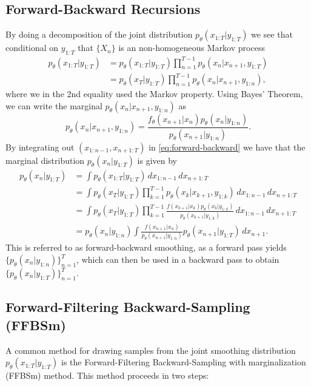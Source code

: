 \subsection{Forward-Backward Recursions}
By doing a decomposition of the joint distribution $p_\theta(x_{1:T} \vert y_{1:T})$ we see that conditional on $y_{1:T}$ that $\{X_n\}$ is an non-homogeneous Markov process
\begin{align}
	p_\theta(x_{1:T} \vert y_{1:T})&=p_\theta(x_{1:T} \vert  y_{1:T})\prod_{n=1}^{T-1}p_\theta(x_n \vert x_{n+1}, y_{1:T}) \nonumber \\
	&=p_\theta(x_T \vert y_{1:T})\prod_{n=1}^{T-1}p_\theta(x_n \vert x_{n+1}, y_{1:n}), \label{eq:forward-backward}  
\end{align}
where we in the 2nd equality used the Markov property. Using Bayes' Theorem, we can write the marginal $p_\theta(x_n \vert x_{n+1}, y_{1:n})$ as
\begin{equation}
	p_\theta(x_n \vert x_{n+1}, y_{1:n}) = \frac{f_\theta(x_{n+1} \vert x_n) p_\theta(x_n \vert y_{1:n})}{p_\theta(x_{n+1} \vert y_{1:n})}.
	\label{eq:marginal_FBR}
\end{equation}
By integrating out $(x_{1:n-1}, x_{n+1:T})$ in  \cref{eq:forward-backward} we have that the marginal distribution $p_\theta(x_n \vert y_{1:T})$ is given by
\begin{align}
	p_\theta(x_n \vert y_{1:T})&=\int p_\theta(x_{1:T} \vert y_{1:T})\, dx_{1:n-1} \, dx_{n+1:T} \nonumber \\
	&=\int p_\theta(x_T \vert y_{1:T})\prod_{k=1}^{T-1}p_\theta(x_k \vert x_{k+1}, y_{1:k}) \, dx_{1:n-1} \, dx_{n+1:T} \nonumber \\
	&=\int p_\theta(x_T \vert y_{1:T})\prod_{k=1}^{T-1}\frac{f(x_{k+1} \vert x_k) p_\theta(x_k \vert y_{1:k})}{p_\theta(x_{k+1} \vert y_{1:k})} \, dx_{1:n-1} \, dx_{n+1:T} \nonumber \\
	&=p_\theta(x_n \vert y_{1:n}) \int \frac{f(x_{n+1} \vert x_n)}{p_\theta(x_{n+1} \vert y_{1:n})}p_\theta(x_{n+1} \vert y_{1:T}) \, dx_{n+1}. \label{eq:marginal_backwards}
\end{align}
This is referred to as forward-backward smoothing, as a forward pass yields $\{p_\theta(x_n \vert y_{1:n})\}_{n=1}^{T}$, which can then be used in a backward pass to obtain $\{p_\theta(x_n \vert y_{1:T})\}_{n=1}^T$.

\subsection{Forward-Filtering Backward-Sampling (FFBSm)}
A common method for drawing samples from the joint smoothing distribution \(p_\theta(x_{1:T} \vert y_{1:T})\) is the Forward-Filtering Backward-Sampling with marginalization (FFBSm) method. This method proceeds in two steps:


